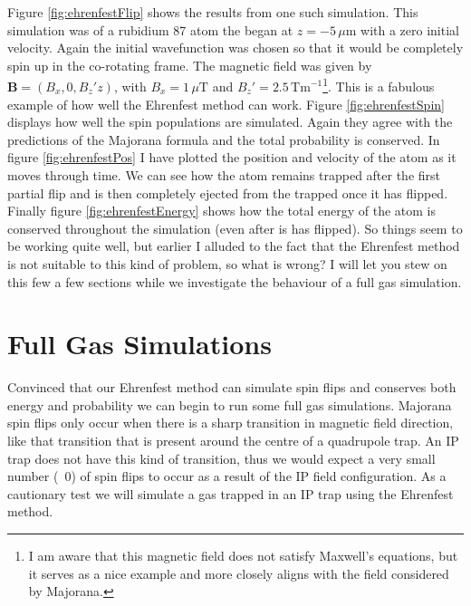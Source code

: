 Figure \ref{fig:ehrenfestFlip} shows the results from one such simulation.
This simulation was of a rubidium 87 atom the began at $z=-5\,\mu\mathrm{m}$ with a zero initial velocity.
Again the initial wavefunction was chosen so that it would be completely spin up in the co-rotating frame.
The magnetic field was given by $\mathbf{B} = (B_x,0,B_z'z)$, with $B_x=1\,\mu\mathrm{T}$ and $B_z'=2.5\,\mathrm{Tm}^{-1}$\footnote{I am aware that this magnetic field does not satisfy Maxwell's equations, but it serves as a nice example and more closely aligns with the field considered by Majorana.}.
This is a fabulous example of how well the Ehrenfest method can work.
Figure \ref{fig:ehrenfestSpin} displays how well the spin populations are simulated.
Again they agree with the predictions of the Majorana formula and the total probability is conserved.
In figure \ref{fig:ehrenfestPos} I have plotted the position and velocity of the atom as it moves through time.
We can see how the atom remains trapped after the first partial flip and is then completely ejected from the trapped once it has flipped.
Finally figure \ref{fig:ehrenfestEnergy} shows how the total energy of the atom is conserved throughout the simulation (even after is has flipped).
So things seem to be working quite well, but earlier I alluded to the fact that the Ehrenfest method is not suitable to this kind of problem, so what is wrong?
I will let you stew on this few a few sections while we investigate the behaviour of a full gas simulation.


\section{Full Gas Simulations}

Convinced that our Ehrenfest method can simulate spin flips and conserves both energy and probability we can begin to run some full gas simulations.
Majorana spin flips only occur when there is a sharp transition in magnetic field direction, like that transition that is present around the centre of a quadrupole trap.
An IP trap does not have this kind of transition, thus we would expect a very small number (~0) of spin flips to occur as a result of the IP field configuration.
As a cautionary test we will simulate a gas trapped in an IP trap using the Ehrenfest method.

